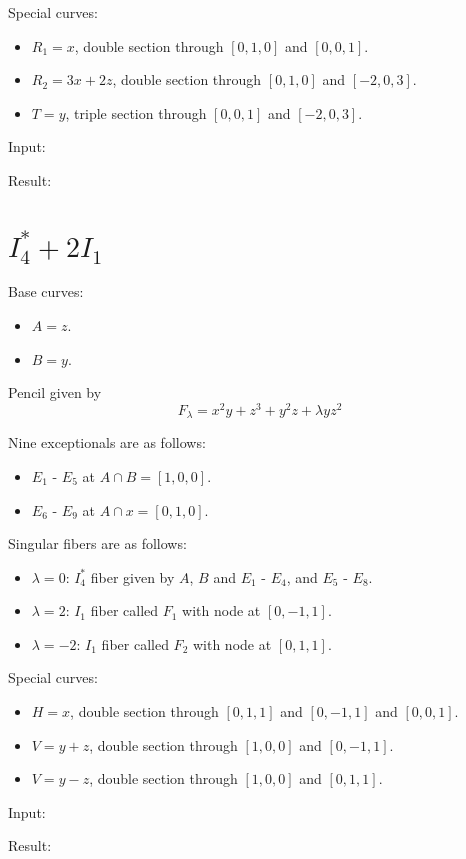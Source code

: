 \documentclass{article}
\begin{document}
Special curves:
\begin{itemize}
  \item $R_1 = x$, double section through $[0,1,0]$ and $[0,0,1]$.
  \item $R_2 = 3x + 2z$, double section through $[0,1,0]$ and $[-2,0,3]$.
  \item $T = y$, triple section through $[0,0,1]$ and $[-2,0,3]$.
\end{itemize}
Input:

Result:







\section{$I_4^* + 2I_1$}

Base curves:
\begin{itemize}
  \item $A = z$.
  \item $B = y$.
\end{itemize}
Pencil given by
\[F_\lambda = x^2y + z^3 + y^2z + \lambda yz^2\]

Nine exceptionals are as follows:
\begin{itemize}
  \item $E_1$ - $E_5$ at $A \cap B = [1,0,0]$.
  \item $E_6$ - $E_9$ at $A \cap x = [0,1,0]$.
\end{itemize}
Singular fibers are as follows:
\begin{itemize}
  \item $\lambda = 0$: $I_4^*$ fiber given by $A$, $B$ and $E_1$ - $E_4$, and $E_5$ - $E_8$.
  \item $\lambda = 2$: $I_1$ fiber called $F_1$ with node at $[0,-1,1]$.
  \item $\lambda = -2$: $I_1$ fiber called $F_2$ with node at $[0,1,1]$.
\end{itemize}

Special curves:
\begin{itemize}
  \item $H = x$, double section through $[0,1,1]$ and $[0,-1,1]$ and $[0,0,1]$.
  \item $V = y + z$, double section through $[1,0,0]$ and $[0,-1,1]$.
  \item $V = y - z$, double section through $[1,0,0]$ and $[0,1,1]$.
\end{itemize}
Input:

Result:

\end{document}
